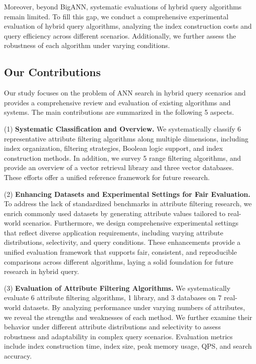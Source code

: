 \documentclass[sigconf, nonacm]{acmart}
\begin{document}
	Moreover, beyond BigANN, systematic evaluations of hybrid query algorithms remain limited. To fill this gap, we conduct a comprehensive experimental evaluation of hybrid query algorithms, analyzing the index construction costs and query efficiency across different scenarios. Additionally, we further assess the robustness of each algorithm under varying conditions.
	
	
	\subsection{Our Contributions}
	
	Our study focuses on the problem of ANN search in hybrid query scenarios and provides a comprehensive review and evaluation of existing algorithms and systems. The main contributions are summarized in the following 5 aspects.
	
	(1)\textbf{ Systematic Classification and Overview.}
	We systematically classify 6 representative attribute filtering algorithms along multiple dimensions, including index organization, filtering strategies, Boolean logic support, and index construction methods. In addition, we survey 5 range filtering algorithms, and provide an overview of a vector retrieval library and three vector databases. These efforts offer a unified reference framework for future research.
	
		(2) \textbf{Enhancing Datasets and Experimental Settings for Fair Evaluation.}
		To address the lack of standardized benchmarks in attribute filtering research, we enrich commonly used datasets by generating attribute values tailored to real-world scenarios. Furthermore, we design comprehensive experimental settings that reflect diverse application requirements, including varying attribute distributions, selectivity, and query conditions. These enhancements provide a unified evaluation framework that supports fair, consistent, and reproducible comparisons across different algorithms, laying a solid foundation for future research in hybrid query.
	
	
	(3)\textbf{ Evaluation of Attribute Filtering Algorithms.}
	We systematically evaluate 6 attribute filtering algorithms, 1 library, and 3 databases on 7 real-world datasets. By analyzing performance under varying numbers of attributes, we reveal the strengths and weaknesses of each method. We further examine their behavior under different attribute distributions and selectivity to assess robustness and adaptability in complex query scenarios. Evaluation metrics include index construction time, index size, peak memory usage, QPS, and search accuracy.
	
\end{document}
